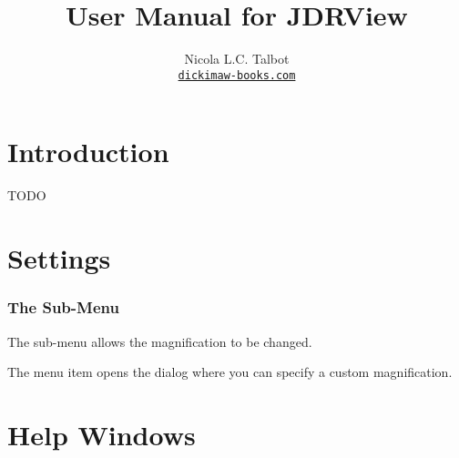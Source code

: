 
\usepackage{fontspec}
\setmainfont{Linux Libertine O}
\usepackage{verbatim}
\usepackage
 [
    novref,
 ]{texjavahelp}

\hypersetup{colorlinks,linkcolor=blue}

\newcommand{\appname}{JDRView}

\title{User Manual for \appname}
\author{Nicola L.C. Talbot\\\href{https://www.dickimaw-books.com/}{\nolinkurl{dickimaw-books.com}}}


\GlsXtrLoadResources[src={jdrview,shared,\langbibsrcs},
 \TeXJavaHelpSymbolResourceOptions
]

\GlsXtrLoadResources[src={jdrview,shared,\langbibsrcs},
 \TeXJavaHelpGlsResourceOptions
]


\maketitle
\frontmatter
\tableofcontents
\listoffigures

\chapter{Introduction}
\label{sec:intro}

TODO

\chapter{Settings}
\label{sec:settings}

\subsection{The  Sub-Menu}
\label{sec:zoommenu}


The  sub-menu allows the magnification to
be changed.


The  menu item opens the
 dialog where you can specify a custom
magnification.

\chapter{Help Windows}
\label{sec:helpwindows}

